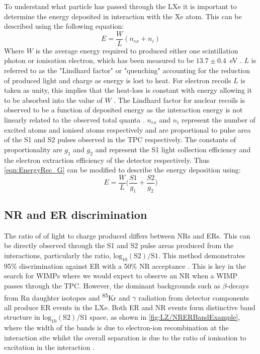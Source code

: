 To understand what particle has passed through the LXe it is important to determine the energy deposited in interaction with the Xe atom. This can be described using the following equation:
\begin{equation}
    E=\frac{W}{L}(n_{ex}+n_{i})
    \label{eqn:EnergyRec_noG}
\end{equation}
Where $W$ is the average energy required to produced either one scintillation photon or ionisation electron, which has been measured to be $13.7\pm0.4$~eV \cite{Goetzke:2016lfg, Dahl:2009nta}.
$L$ is referred to as the "Lindhard factor" or "quenching" accounting for the reduction of produced light and charge as energy is lost to heat. For electron recoils $L$ is taken as unity, this implies that the heat-loss is constant with energy allowing it to be absorbed into the value of $W$ \cite{Rischbieter:2022}. The Lindhard factor for nuclear recoils is observed to be a function of deposited energy as the interaction energy is not linearly related to the observed total quanta \cite{Sorensen:2011bd}.
$n_{ex}$ and $n_{i}$ represent the number of excited atoms and ionised atoms respectively and are proportional to pulse area of the S1 and S2 pulses observed in the TPC respectively. The constants of proportionality are $g_1$ and $g_2$ and represent the S1 light collection efficiency and the electron extraction efficiency of the detector respectively. Thus \autoref{eqn:EnergyRec_G} can be modified to describe the energy deposition using:
\begin{equation}
    E=\frac{W}{L}\bigg(\frac{S1}{g_1}+\frac{S2}{g_2}\biggl)
    \label{eqn:EnergyRec_G}
\end{equation}

\subsection{NR and ER discrimination}\label{LZ/NRERDiscrim}
The ratio of of light to charge produced differs between NRs and ERs. This can be directly observed through the S1 and S2 pulse areas produced from the interactions, particularly the ratio, $\text{log}_{10}(\text{S2})/\text{S1}$. This method demonstrates 95\% discrimination against ER with a 50\% NR acceptance \cite{lzSens}. This is key in the search for WIMPs where we would expect to observe an NR when a WIMP passes through the TPC. However, the dominant backgrounds such as $\beta$-decays from Rn daughter isotopes and \textsuperscript{85}Kr and $\gamma$ radiation from detector components all produce ER events in the LXe. Both ER and NR events form distinctive band structure in $\text{log}_{10}(\text{S2})/\text{S1}$ space, as shown in \autoref{fig:LZ/NRERBandExample}, where the width of the bands is due to electron-ion recombination at the interaction site whilst the overall separation is due to the ratio of ionisation to excitation in the interaction \cite{Dahl:2009nta}.

